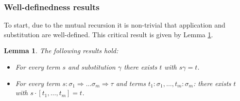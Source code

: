 \documentclass{lmcs}
\theoremstyle{theorem}\newtheorem{theorem}{Theorem}
\theoremstyle{theorem}\newtheorem{lemma}[theorem]{Lemma}
\theoremstyle{theorem}\newtheorem{corollary}[theorem]{Corollary}
\theoremstyle{definition}\newtheorem{definition}[theorem]{Definition}
\theoremstyle{definition}\newtheorem{example}[theorem]{Example}
\newcommand{\atype}{\sigma}
\newcommand{\btype}{\tau}
\newcommand{\arrtype}{\Rightarrow}
\newcommand{\mysubsection}[1]{\vspace{-12pt}\subsubsection{#1}}
\begin{document}
\mysubsection{Well-definedness results}
To start, due to the mutual recursion it is non-trivial that application and substitution are
well-defined.  This critical result is given by Lemma \ref{lem:substdefined}.

\begin{lemma}\label{lem:substdefined}
The following results hold:
\begin{itemize}
\item For every term $s$ and substitution $\gamma$ there exists $t$ with $s\gamma = t$.
\item For every term $s : \atype_1 \arrtype \dots \atype_m \arrtype \btype$ and terms
  $t_1 : \atype_1,\dots,t_m : \atype_m$: there exists $t$ with $s \cdot [t_1,\dots,t_m] = t$.
\end{itemize}
\end{lemma}
\end{document}

